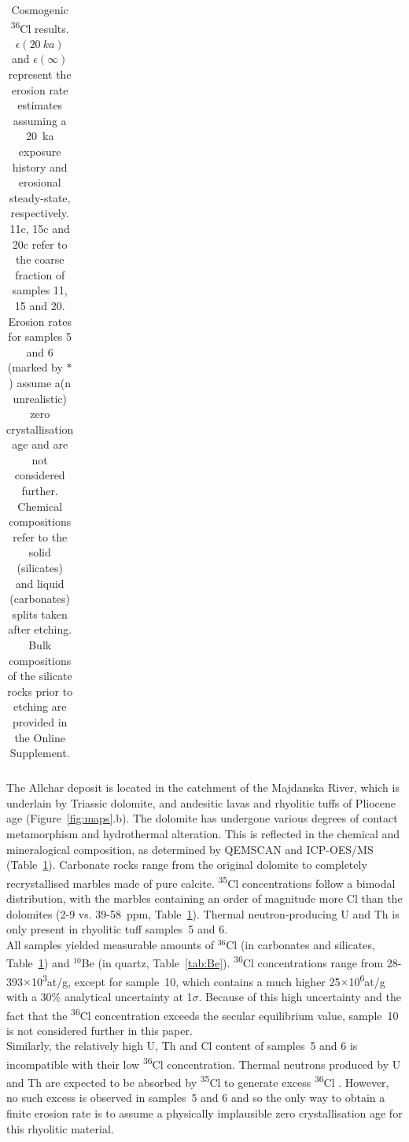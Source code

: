 \documentclass[titlepage]{article}
\begin{document}
\begin{table}[!ht]
\begin{tabular}{ cccccccccc }
  \end{tabular}
  \caption{Cosmogenic \textsuperscript{36}Cl
    results. $\epsilon(20~ka)$ and $\epsilon(\infty)$ represent the
    erosion rate estimates assuming a 20~ka exposure history and
    erosional steady-state, respectively. 11c, 15c and 20c refer to
    the coarse fraction of samples 11, 15 and 20. Erosion rates for
    samples 5 and 6 (marked by $\ast$) assume a(n unrealistic) zero
    crystallisation age and are not considered further. Chemical
    compositions refer to the solid (silicates) and liquid
    (carbonates) splits taken after etching.  Bulk compositions of the
    silicate rocks prior to etching are provided in the Online
    Supplement.}
  \label{tab:Cl}
\end{table}

The Allchar deposit is located in the catchment of the Majdanska
River, which is underlain by Triassic dolomite, and andesitic lavas
and rhyolitic tuffs of Pliocene age (Figure~\ref{fig:maps}.b). The
dolomite has undergone various degrees of contact metamorphism and
hydrothermal alteration. This is reflected in the chemical and
mineralogical composition, as determined by QEMSCAN and ICP-OES/MS
(Table~\ref{tab:Cl}).  Carbonate rocks range from the original
dolomite to completely recrystallised marbles made of pure calcite.
\textsuperscript{35}Cl concentrations follow a bimodal distribution,
with the marbles containing an order of magnitude more Cl than the
dolomites (2-9 vs. 39-58~ppm, Table~\ref{tab:Cl}). Thermal
neutron-producing U and Th is only present in rhyolitic tuff samples~5
and 6.\\

All samples yielded measurable amounts of $^{36}$Cl (in carbonates and
silicates, Table~\ref{tab:Cl}) and $^{10}$Be (in quartz,
Table~\ref{tab:Be}). \textsuperscript{36}Cl concentrations range from
28-393$\times$10\textsuperscript{3}at/g, except for sample~10, which
contains a much higher 25$\times$10\textsuperscript{6}at/g with a 30\%
analytical uncertainty at 1$\sigma$. Because of this high uncertainty
and the fact that the \textsuperscript{36}Cl concentration exceeds the
secular equilibrium value, sample~10 is not considered further in this
paper.\\

Similarly, the relatively high U, Th and Cl content of samples~5 and 6
is incompatible with their low \textsuperscript{36}Cl
concentration. Thermal neutrons produced by U and Th are expected to
be absorbed by \textsuperscript{35}Cl to generate excess
\textsuperscript{36}Cl \citep{alfimov2009}. However, no such excess is
observed in samples~5 and 6 and so the only way to obtain a finite
erosion rate is to assume a physically implausible zero
crystallisation age for this rhyolitic material.\\
\end{document}
